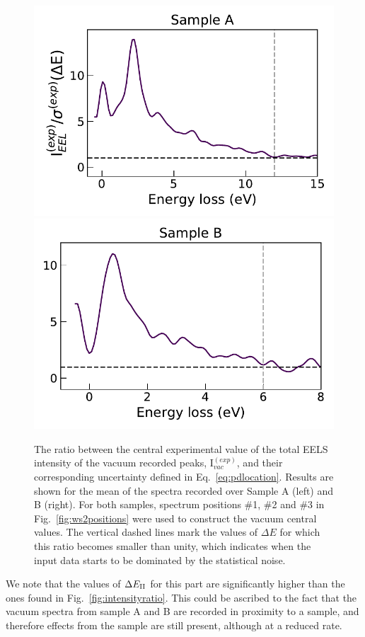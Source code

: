 \begin{figure}[H]
\begin{centering}
  \includegraphics[width=0.49\linewidth]{plots/delta2_sampleA.pdf}
  \includegraphics[width=0.49\linewidth]{plots/delta2_sampleB.pdf}
  \caption{The ratio between the central experimental value of the total EELS intensity 
  of the vacuum recorded peaks, I$^{(exp)}_{vac}$,
  and their corresponding uncertainty defined in Eq.~\ref{eq:pdlocation}.
  Results are shown for the mean of the spectra recorded over Sample A (left) and B (right). 
  For both samples, spectrum positions \#1, \#2 and \#3 in Fig.~\ref{fig:ws2positions}
  were used to construct the vacuum central values.
  The vertical dashed lines mark the values of $\Delta E$ for which this ratio becomes smaller 
  than unity, which indicates when the input data starts to be dominated by the statistical noise. 
  }
\label{fig:pdlocsample}
\end{centering}
\end{figure}

We note that the values of $\Delta E_{\rm II}$ for this part are significantly higher than
the ones found in Fig.~\ref{fig:intensityratio}. This could be ascribed to the fact that 
the vacuum spectra from sample A and B are recorded in proximity to a sample, and therefore
effects from the sample are still present, although at a reduced rate.\\

